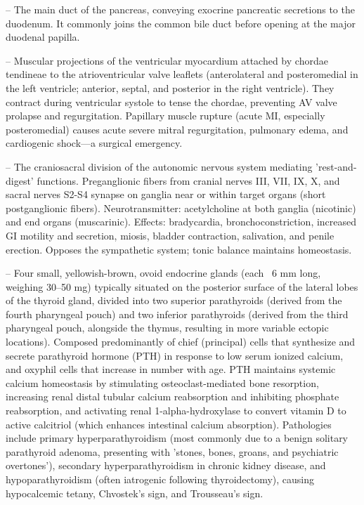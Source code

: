 -- The main duct of the pancreas, conveying exocrine pancreatic secretions to the duodenum. It commonly joins the common bile duct before opening at the major duodenal papilla.

-- Muscular projections of the ventricular myocardium attached by chordae tendineae to the atrioventricular valve leaflets (anterolateral and posteromedial in the left ventricle; anterior, septal, and posterior in the right ventricle). They contract during ventricular systole to tense the chordae, preventing AV valve prolapse and regurgitation. Papillary muscle rupture (acute MI, especially posteromedial) causes acute severe mitral regurgitation, pulmonary edema, and cardiogenic shock—a surgical emergency.

-- The craniosacral division of the autonomic nervous system mediating 'rest-and-digest' functions. Preganglionic fibers from cranial nerves III, VII, IX, X, and sacral nerves S2-S4 synapse on ganglia near or within target organs (short postganglionic fibers). Neurotransmitter: acetylcholine at both ganglia (nicotinic) and end organs (muscarinic). Effects: bradycardia, bronchoconstriction, increased GI motility and secretion, miosis, bladder contraction, salivation, and penile erection. Opposes the sympathetic system; tonic balance maintains homeostasis.

-- Four small, yellowish-brown, ovoid endocrine glands (each ~6 mm long, weighing 30--50 mg) typically situated on the posterior surface of the lateral lobes of the thyroid gland, divided into two superior parathyroids (derived from the fourth pharyngeal pouch) and two inferior parathyroids (derived from the third pharyngeal pouch, alongside the thymus, resulting in more variable ectopic locations). Composed predominantly of chief (principal) cells that synthesize and secrete parathyroid hormone (PTH) in response to low serum ionized calcium, and oxyphil cells that increase in number with age. PTH maintains systemic calcium homeostasis by stimulating osteoclast-mediated bone resorption, increasing renal distal tubular calcium reabsorption and inhibiting phosphate reabsorption, and activating renal 1-alpha-hydroxylase to convert vitamin D to active calcitriol (which enhances intestinal calcium absorption). Pathologies include primary hyperparathyroidism (most commonly due to a benign solitary parathyroid adenoma, presenting with 'stones, bones, groans, and psychiatric overtones'), secondary hyperparathyroidism in chronic kidney disease, and hypoparathyroidism (often iatrogenic following thyroidectomy), causing hypocalcemic tetany, Chvostek's sign, and Trousseau's sign.

